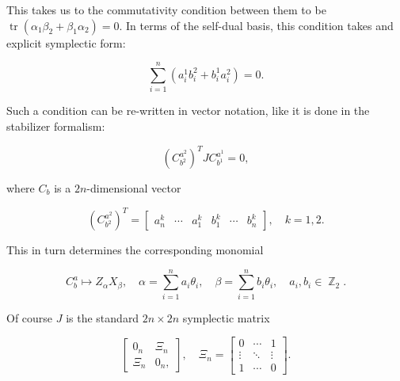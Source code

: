 \documentclass[a4paper,11pt]{report}
\DeclareMathOperator{\Z}{\mathbb{Z}}
\DeclareMathOperator{\tr}{tr}
\begin{document}
    This takes us to the commutativity condition between
    them to be $\tr(\alpha_1\beta_2 + \beta_1\alpha_2) = 0$.
    In terms of the self-dual basis, this condition takes
    and explicit symplectic form:

    \begin{equation}
        \sum_{i=1}^{n} 
        \left( a_i^{1}b_i^{2} + b_i^{1}a_i^{2} \right) = 0.
    \end{equation}

    Such a condition can be re-written in vector notation,
    like it is done in the stabilizer formalism:

    \begin{equation}
        \left(C_{b^2}^{a^2}\right)^{T}
        J
        C^{a^{1}}_{b^{1}} = 0,
    \end{equation}
    
    where $C_{b}$ is a $2n$-dimensional vector

    \begin{equation}
        \left(C_{b^2}^{a^2}\right)^{T}
        = \begin{bmatrix}
            a_n^k & \cdots & a_1^k & b_1^k & \cdots & b_n^k
        \end{bmatrix},
        \quad k = 1, 2.
    \end{equation}

    This in turn determines the corresponding monomial

    \begin{equation}
        C_b^a \mapsto Z_\alpha X_\beta,
        \quad
        \alpha = \sum_{i=1}^{n} a_i \theta_i,
        \quad
        \beta = \sum_{i=1}^{n} b_i \theta_i,
        \quad
        a_i,b_i \in \Z_2.
    \end{equation}

    Of course $J$ is the standard $2n \times 2n$ symplectic
    matrix

    \begin{equation}
        \begin{bmatrix}
            0_n & \Xi_n \\
            \Xi_n & 0_n,
        \end{bmatrix},
        \quad
        \Xi_n = \begin{bmatrix}
            0 & \cdots & 1 \\
            \vdots & \ddots & \vdots \\
            1 & \cdots & 0
        \end{bmatrix}. 
    \end{equation}
\end{document}
